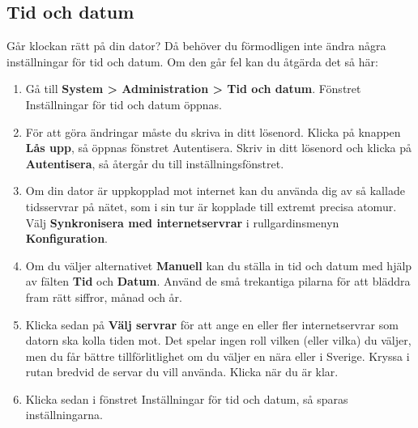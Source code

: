 \documentclass[a4paper,final]{memoir} %
\begin{document}


\subsection{Tid och datum}


Går klockan rätt på din dator? Då behöver du förmodligen inte ändra några inställningar för tid och datum. Om den går fel kan du åtgärda det så här:


\begin{enumerate}

\item Gå till \textbf{System \textgreater{} Administration \textgreater{} Tid och datum}. Fönstret Inställningar för tid och datum öppnas.

\item För att göra ändringar måste du skriva in ditt lösenord. Klicka på knappen \textbf{Lås upp}, så öppnas fönstret Autentisera. Skriv in ditt lösenord och klicka på \textbf{Autentisera}, så återgår du till inställningsfönstret.

\item Om din dator är uppkopplad mot internet kan du använda dig av så kallade tidsservrar på nätet, som i sin tur är kopplade till extremt precisa atomur. Välj \textbf{Synkronisera med internetservrar} i rullgardinsmenyn \textbf{Konfiguration}.

\item Om du väljer alternativet \textbf{Manuell} kan du ställa in tid och datum med hjälp av fälten \textbf{Tid} och \textbf{Datum}. Använd de små trekantiga pilarna för att bläddra fram rätt siffror, månad och år.

\item Klicka sedan på \textbf{Välj servrar} för att ange en eller fler internetservrar som datorn ska kolla tiden mot. Det spelar ingen roll vilken (eller vilka) du väljer, men du får bättre tillförlitlighet om du väljer en nära eller i Sverige. Kryssa i rutan bredvid de servar du vill använda. Klicka \xstang{} när du är klar.

\item Klicka sedan \xstang{} i fönstret Inställningar för tid och datum, så sparas inställningarna.

\end{enumerate}
\end{document}
